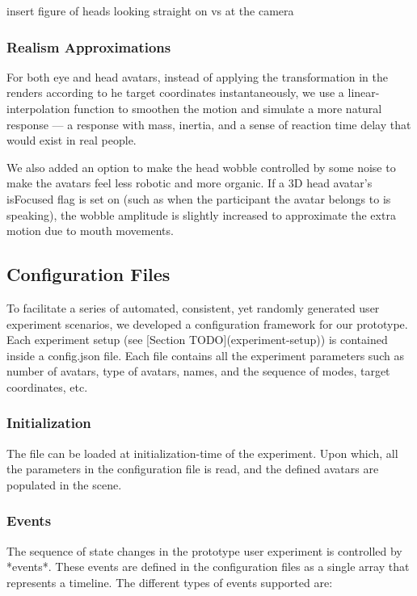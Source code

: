 insert figure of heads looking straight on vs at the camera

\subsubsection{Realism Approximations}

For both eye and head avatars, instead of applying the transformation in the renders according to he target coordinates instantaneously, we use a linear-interpolation function to smoothen the motion and simulate a more natural response --- a response with mass, inertia, and a sense of reaction time delay that would exist in real people.

We also added an option to make the head wobble controlled by some noise to make the avatars feel less robotic and more organic. If a 3D head avatar’s isFocused flag is set on (such as when the participant the avatar belongs to is speaking), the wobble amplitude is slightly increased to approximate the extra motion due to mouth movements.

\subsection{Configuration Files}

To facilitate a series of automated, consistent, yet randomly generated user experiment scenarios, we developed a configuration framework for our prototype. Each experiment setup (see [Section TODO](experiment-setup)) is contained inside a config.json file. Each file contains all the experiment parameters such as number of avatars, type of avatars, names, and the sequence of modes, target coordinates, etc. 

\subsubsection{Initialization}

The file can be loaded at initialization-time of the experiment. Upon which, all the parameters in the configuration file is read, and the defined avatars are populated in the scene. 

\subsubsection{Events}

The sequence of state changes in the prototype user experiment is controlled by *events*. These events are defined in the configuration files as a single array that represents a timeline. The different types of events supported are:

